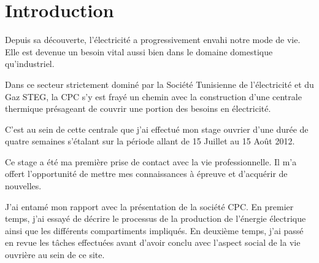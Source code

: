 \chapter*{Introduction}
Depuis sa découverte, l'électricité a progressivement envahi  notre mode de vie.\\Elle est devenue un besoin vital aussi bien dans le domaine domestique qu'industriel.

Dans ce secteur strictement dominé par la Société Tunisienne de l'électricité et du Gaz STEG, la CPC s'y est frayé un chemin  avec la construction d'une centrale thermique présageant de couvrir une portion des besoins en électricité.

C'est au sein de cette centrale que j'ai effectué mon stage ouvrier d'une durée de quatre semaines s'étalant sur la période allant de 15 Juillet au 15 Août 2012. 

Ce stage a été  ma première  prise de contact avec  la vie professionnelle. Il m'a offert l'opportunité de mettre mes connaissances à épreuve et d'acquérir de nouvelles.

J'ai entamé mon rapport avec la présentation de la société CPC. En premier temps, j'ai essayé de décrire le processus de la production de l'énergie électrique ainsi que les différents compartiments impliqués. En deuxième temps, j'ai passé en revue  les tâches effectuées avant d'avoir conclu avec l'aspect social de la vie ouvrière au sein de ce site. 